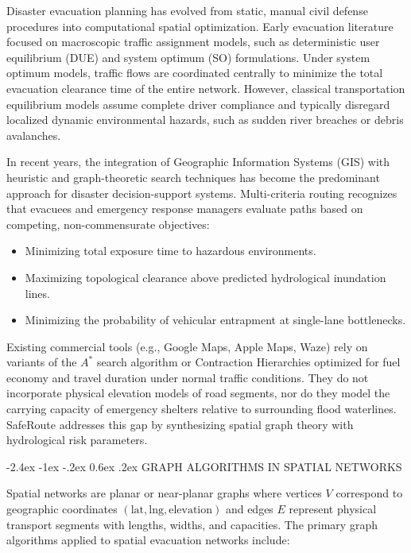 \documentclass[12pt,oneside]{report}
\makeatletter
\renewcommand{\section}{\@startsection{section}{1}{\z@}%
  {-2.4ex \@plus -1ex \@minus -.2ex}%
  {0.6ex \@plus .2ex}%
  {\normalfont\large\bfseries}}
\makeatother
\begin{document}
Disaster evacuation planning has evolved from static, manual civil defense procedures into computational spatial optimization. Early evacuation literature focused on macroscopic traffic assignment models, such as deterministic user equilibrium (DUE) and system optimum (SO) formulations. Under system optimum models, traffic flows are coordinated centrally to minimize the total evacuation clearance time of the entire network. However, classical transportation equilibrium models assume complete driver compliance and typically disregard localized dynamic environmental hazards, such as sudden river breaches or debris avalanches.

In recent years, the integration of Geographic Information Systems (GIS) with heuristic and graph-theoretic search techniques has become the predominant approach for disaster decision-support systems. Multi-criteria routing recognizes that evacuees and emergency response managers evaluate paths based on competing, non-commensurate objectives:
\begin{itemize}
    \item Minimizing total exposure time to hazardous environments.
    \item Maximizing topological clearance above predicted hydrological inundation lines.
    \item Minimizing the probability of vehicular entrapment at single-lane bottlenecks.
\end{itemize}
Existing commercial tools (e.g., Google Maps, Apple Maps, Waze) rely on variants of the $A^*$ search algorithm or Contraction Hierarchies optimized for fuel economy and travel duration under normal traffic conditions. They do not incorporate physical elevation models of road segments, nor do they model the carrying capacity of emergency shelters relative to surrounding flood waterlines. SafeRoute addresses this gap by synthesizing spatial graph theory with hydrological risk parameters.

\section{GRAPH ALGORITHMS IN SPATIAL NETWORKS}

Spatial networks are planar or near-planar graphs where vertices $V$ correspond to geographic coordinates $(\text{lat}, \text{lng}, \text{elevation})$ and edges $E$ represent physical transport segments with lengths, widths, and capacities. The primary graph algorithms applied to spatial evacuation networks include:
\end{document}
